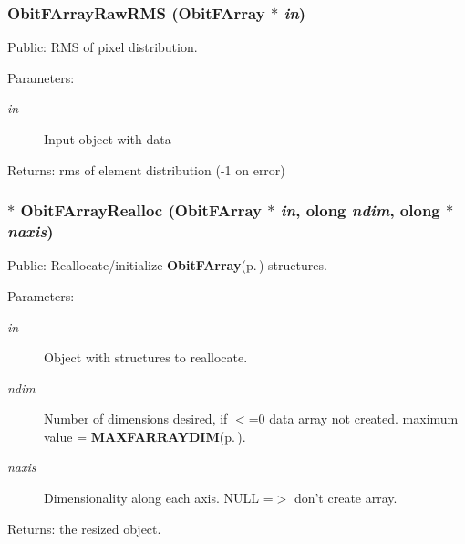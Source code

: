 \subsubsection{ Obit\-FArray\-Raw\-RMS ({\bf Obit\-FArray} $\ast$ {\em in})}\label{ObitFArray_8c_a29}


Public: RMS of pixel distribution. 

\begin{Desc}
\item[Parameters:]
\begin{description}
\item[{\em in}]Input object with data \end{description}
\end{Desc}
\begin{Desc}
\item[Returns:]rms of element distribution (-1 on error) \end{Desc}
\subsubsection{$\ast$ Obit\-FArray\-Realloc ({\bf Obit\-FArray} $\ast$ {\em in}, {\bf olong} {\em ndim}, {\bf olong} $\ast$ {\em naxis})}\label{ObitFArray_8c_a22}


Public: Reallocate/initialize {\bf Obit\-FArray}{\rm (p.\,\pageref{structObitFArray})} structures. 

\begin{Desc}
\item[Parameters:]
\begin{description}
\item[{\em in}]Object with structures to reallocate. \item[{\em ndim}]Number of dimensions desired, if $<$=0 data array not created. maximum value = {\bf MAXFARRAYDIM}{\rm (p.\,\pageref{ObitFArray_8h_a3})}. \item[{\em naxis}]Dimensionality along each axis. NULL =$>$ don't create array. \end{description}
\end{Desc}
\begin{Desc}
\item[Returns:]the resized object. \end{Desc}
